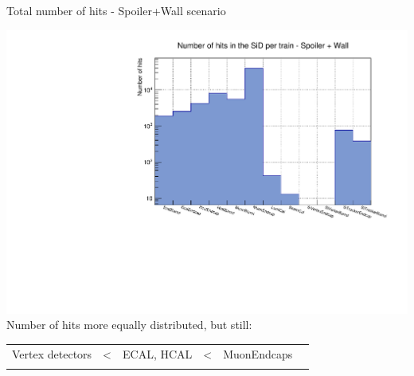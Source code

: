 \documentclass[xcolor={dvipsnames}]{beamer}
\begin{document}
\begin{frame}{Total number of hits - Spoiler+Wall scenario}
 \begin{center}
\includegraphics[height=0.65\textheight]{Number_Hits_per_Subdetector_SpoilerWall.pdf}\\
Number of hits more equally distributed, but still:\\
\begin{tabular}{@{}p{}p{}p{}p{}p{}p{}@{}}
 \centering Vertex detectors & < & \centering ECAL, HCAL & < & \centering MuonEndcaps & \\
  \centering{\scriptsize Smallest effective detector area} & &  \centering{\scriptsize Particle showers} & &  \centering{\scriptsize Biggest effective detector area}&
\end{tabular}
\end{center}
\end{frame}
\end{document}
